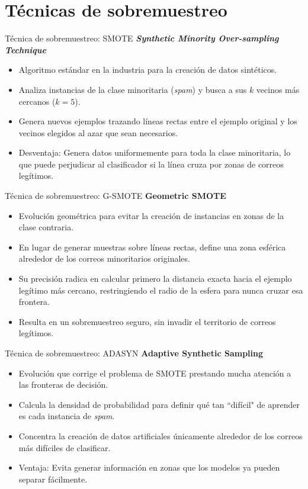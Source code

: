 \documentclass[10pt]{beamer}
\begin{document}
\section{Técnicas de sobremuestreo}

\begin{frame}{Técnica de sobremuestreo: SMOTE}
  \textbf{\textit{Synthetic Minority Over-sampling Technique}}
  \begin{itemize}
    \item Algoritmo estándar en la industria para la creación de datos sintéticos.
    \item Analiza instancias de la clase minoritaria (\textit{spam}) y busca a sus $k$ vecinos más cercanos ($k=5$).
    \item Genera nuevos ejemplos trazando líneas rectas entre el ejemplo original y los vecinos elegidos al azar que sean necesarios.
    \item Desventaja: Genera datos uniformemente para toda la clase minoritaria, lo que puede perjudicar al clasificador si la línea cruza por zonas de correos legítimos.
  \end{itemize}
\end{frame}

\begin{frame}{Técnica de sobremuestreo: G-SMOTE}
  \textbf{Geometric SMOTE}
  \begin{itemize}
    \item Evolución geométrica para evitar la creación de instancias en zonas de la clase contraria.
    \item En lugar de generar muestras sobre líneas rectas, define una zona esférica alrededor de los correos minoritarios originales.
    \item Su precisión radica en calcular primero la distancia exacta hacia el ejemplo legítimo más cercano, restringiendo el radio de la esfera para nunca cruzar esa frontera.
    \item Resulta en un sobremuestreo seguro, sin invadir el territorio  de correos legítimos.
  \end{itemize}
\end{frame}

\begin{frame}{Técnica de sobremuestreo: ADASYN}
  \textbf{Adaptive Synthetic Sampling}
  \begin{itemize}
    \item Evolución que corrige el problema de SMOTE prestando mucha atención a las fronteras de decisión.
    \item Calcula la densidad de probabilidad para definir qué tan ``difícil" de aprender es cada instancia de \textit{spam}.
    \item Concentra la creación de datos artificiales únicamente alrededor de los correos más difíciles de clasificar.
    \item Ventaja: Evita generar información en zonas que los modelos ya pueden separar fácilmente.
  \end{itemize}
\end{frame}
\end{document}
